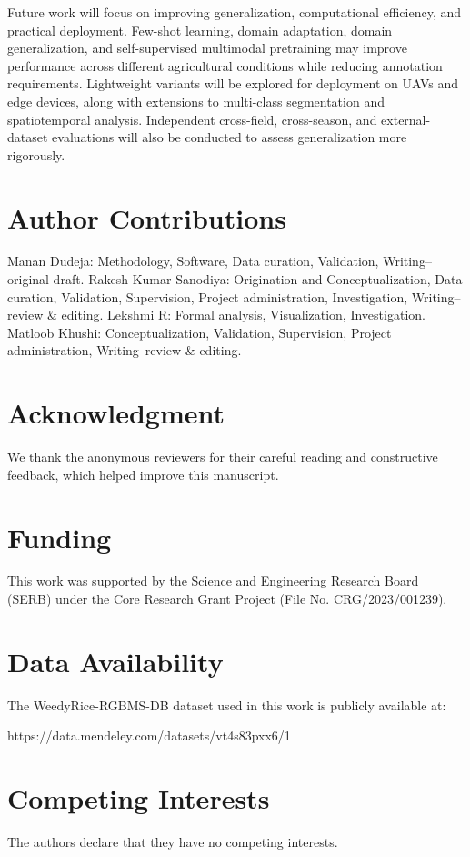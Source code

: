 \documentclass[pdflatex,sn-mathphys-num]{sn-jnl}
\begin{document}
Future work will focus on improving generalization, computational efficiency, and practical deployment. Few-shot learning, domain adaptation, domain generalization, and self-supervised multimodal pretraining may improve performance across different agricultural conditions while reducing annotation requirements. Lightweight variants will be explored for deployment on UAVs and edge devices, along with extensions to multi-class segmentation and spatiotemporal analysis. Independent cross-field, cross-season, and external-dataset evaluations will also be conducted to assess generalization more rigorously.

\section*{Author Contributions}

Manan Dudeja: Methodology, Software, Data curation, Validation, Writing--original draft.
Rakesh Kumar Sanodiya: Origination and Conceptualization, Data curation, Validation, Supervision, Project administration, Investigation, Writing--review \& editing.
Lekshmi R: Formal analysis, Visualization, Investigation.
Matloob Khushi: Conceptualization, Validation, Supervision, Project administration, Writing--review \& editing.

\section*{Acknowledgment}
We thank the anonymous reviewers for their careful reading and constructive feedback, which helped improve this manuscript.

\section*{Funding}
This work was supported by the
Science and Engineering Research Board (SERB)
under the Core Research Grant Project (File No. 
CRG/2023/001239). 

\section*{Data Availability}

The WeedyRice-RGBMS-DB dataset used in this work is publicly available at: 

https://data.mendeley.com/datasets/vt4s83pxx6/1

\section*{Competing Interests}

The authors declare that they have no competing interests.



\end{document}
